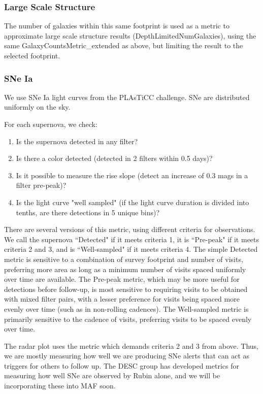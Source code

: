 \subsubsection{Large Scale Structure}
The number of galaxies within this same footprint is used as a metric to approximate large scale structure results (DepthLimitedNumGalaxies), using the same GalaxyCountsMetric\_extended as above, but limiting the result to the selected footprint. 

\subsubsection{SNe Ia}

We use SNe Ia light curves from the PLAsTiCC challenge. SNe are distributed uniformly on the sky. 

For each supernova, we check:
\begin{enumerate}
    \item{Is the supernova detected in any filter?}
    \item{Is there a color detected (detected in 2 filters within 0.5 days)?}
    \item{Is it possible to measure the rise slope (detect an increase of 0.3 mags in a filter pre-peak)?}
    \item{Is the light curve "well sampled" (if the light curve duration is divided into tenths, are there detections in 5 unique bins)?}
\end{enumerate}

There are several versions of this metric, using different criteria for observations. We call the supernova ``Detected" if it meets criteria 1, it is ``Pre-peak" if it meets criteria 2 and 3, and is ``Well-sampled" if it meets criteria 4.
The simple Detected metric is sensitive to a combination of survey footprint and number of visits, preferring more area as long as a minimum number of visits spaced uniformly over time are available. The Pre-peak metric, which may be more useful for detections before follow-up, is most sensitive to requiring visits to be obtained with mixed filter pairs, with a lesser preference for visits being spaced more evenly over time (such as in non-rolling cadences). The Well-sampled metric is primarily sensitive to the cadence of visits, preferring visits to be spaced evenly over time. 

The radar plot uses the metric which demands criteria 2 and 3 from above. Thus, we are mostly measuring how well we are producing SNe alerts that can act as triggers for others to follow up. The DESC group has developed metrics for measuring how well SNe are observed by Rubin alone, and we will be incorporating these into MAF soon.


